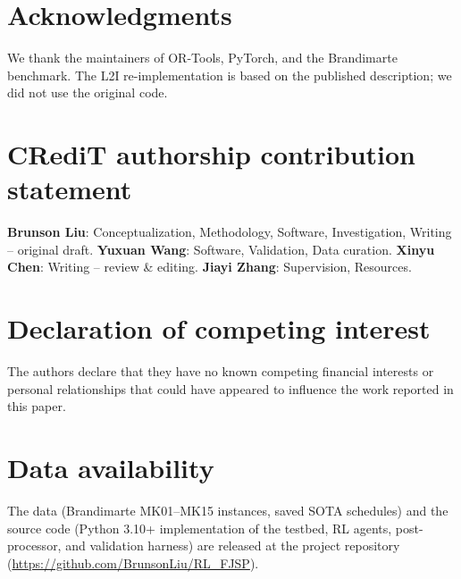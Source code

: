 \documentclass[preprint,review,3p,times,twocolumn]{elsarticle}
\begin{document}
\section*{Acknowledgments}

We thank the maintainers of OR-Tools, PyTorch, and the
Brandimarte benchmark. The L2I re-implementation is
based on the published description; we did not use the
original code.

\section*{CRediT authorship contribution statement}

\textbf{Brunson Liu}: Conceptualization, Methodology,
Software, Investigation, Writing -- original draft.
\textbf{Yuxuan Wang}: Software, Validation, Data curation.
\textbf{Xinyu Chen}: Writing -- review \& editing.
\textbf{Jiayi Zhang}: Supervision, Resources.

\section*{Declaration of competing interest}

The authors declare that they have no known competing
financial interests or personal relationships that could
have appeared to influence the work reported in this paper.

\section*{Data availability}

The data (Brandimarte MK01--MK15 instances, saved SOTA
schedules) and the source code (Python 3.10+ implementation
of the testbed, RL agents, post-processor, and validation
harness) are released at the project repository
(\url{https://github.com/BrunsonLiu/RL_FJSP}).
\end{document}
